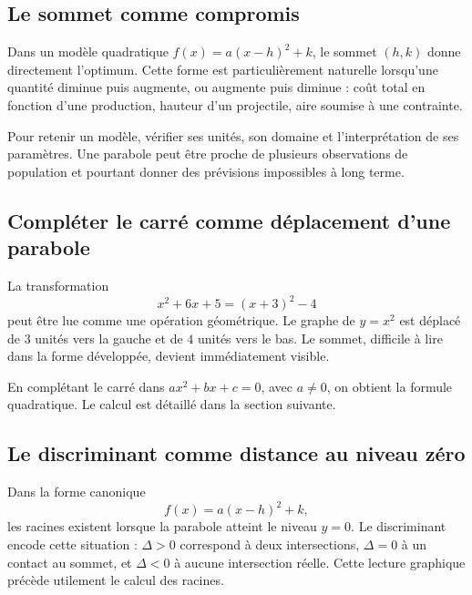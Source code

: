 \subsection{Le sommet comme compromis}
Dans un modèle quadratique $f(x)=a(x-h)^2+k$, le sommet $(h,k)$ donne directement l'optimum. Cette forme est particulièrement naturelle lorsqu'une quantité diminue puis augmente, ou augmente puis diminue : coût total en fonction d'une production, hauteur d'un projectile, aire soumise à une contrainte.

\begin{connectionbox}
Pour retenir un modèle, vérifier ses unités, son domaine et l'interprétation de ses paramètres. Une parabole peut être proche de plusieurs observations de population et pourtant donner des prévisions impossibles à long terme.
\end{connectionbox}



\subsection{Compléter le carré comme déplacement d'une parabole}
La transformation
\[
x^2+6x+5=(x+3)^2-4
\]
peut être lue comme une opération géométrique. Le graphe de $y=x^2$ est déplacé de $3$ unités vers la gauche et de $4$ unités vers le bas. Le sommet, difficile à lire dans la forme développée, devient immédiatement visible.

\begin{center}
\end{center}

En complétant le carré dans $ax^2+bx+c=0$, avec $a\ne0$, on obtient la formule quadratique. Le calcul est détaillé dans la section suivante.

\subsection{Le discriminant comme distance au niveau zéro}
Dans la forme canonique
\[
f(x)=a(x-h)^2+k,
\]
les racines existent lorsque la parabole atteint le niveau $y=0$. Le discriminant encode cette situation : $\Delta>0$ correspond à deux intersections, $\Delta=0$ à un contact au sommet, et $\Delta<0$ à aucune intersection réelle. Cette lecture graphique précède utilement le calcul des racines.



